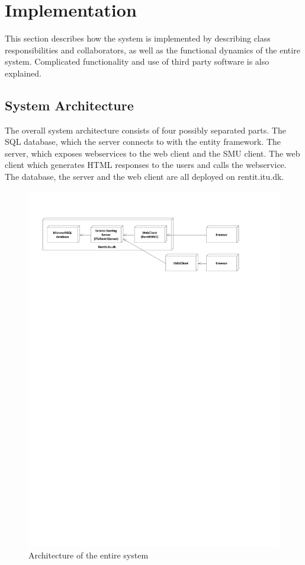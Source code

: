 \documentclass[a4paper,11pt,report]{article}
\begin{document}
\section{Implementation}
This section describes how the system is implemented by describing class responsibilities and collaborators, as well as the functional dynamics of the entire system. Complicated functionality and use of third party software is also explained.

\subsection{System Architecture}
The overall system architecture consists of four possibly separated parts. The SQL database, which the server connects to with the entity framework. The server, which exposes webservices to the web client and the SMU client. The web client which generates HTML responses to the users and calls the webservice. The database, the server and the web client are all deployed on rentit.itu.dk.

\begin{figure}[H]
  \centering
\includegraphics[keepaspectratio=true,trim=60pt 650pt 60pt 50pt]{./overallArchitecture.pdf}
\caption{Architecture of the entire system}
\end{figure}
\end{document}
